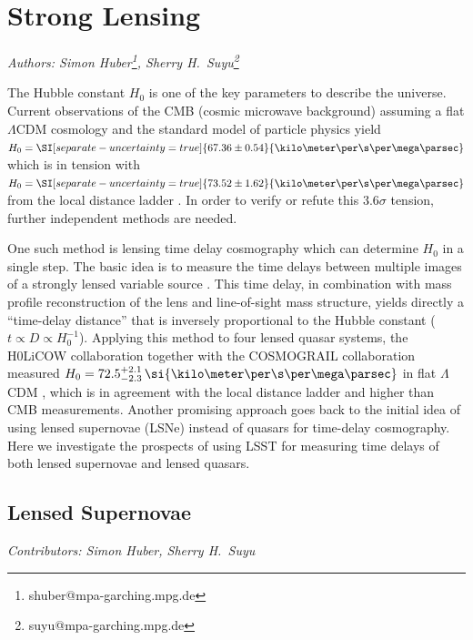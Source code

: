 

\section{Strong Lensing}
\textit{ Authors: Simon Huber\footnote{shuber@mpa-garching.mpg.de}, Sherry H.~Suyu\footnote{suyu@mpa-garching.mpg.de} }

The Hubble constant $H_0$ is one of the key parameters to describe the
universe. Current observations of the CMB (cosmic microwave
background) assuming a flat $\Lambda$CDM cosmology and the standard
model of particle physics yield $H_0 = \SI[separate-uncertainty =
true]{67.36 \pm 0.54}{\kilo\meter\per\s\per\mega\parsec}$
\citep{Planck:2018vks} which is in tension with $H_0 =
\SI[separate-uncertainty = true]{73.52 \pm
  1.62}{\kilo\meter\per\s\per\mega\parsec}$ from the local distance ladder
\citep{Riess:2016jrr,Riess:2018byc}. In order to verify or refute this
$3.6 \sigma$ tension, further independent methods are needed. 

One such method is lensing time delay cosmography which can determine
$H_0$ in a single step. The basic idea is to measure the time delays
between multiple images of a strongly lensed variable source
\citep{Refsdal:1964}. This time delay, in combination with mass
profile reconstruction of the lens and line-of-sight mass structure,
yields directly a ``time-delay distance'' that is inversely
proportional to the Hubble constant ($t \propto D \propto
H_0^{-1}$). Applying this method to four lensed quasar systems, the
H0LiCOW collaboration \citep{Suyu:2016qxx} together with the
COSMOGRAIL collaboration
\citep[e.g.]{Eigenbrod:2005ie,2013Tewes,2017Courbin} measured $H_0 =
72.5^{+2.1}_{-2.3} \, \si{\kilo\meter\per\s\per\mega\parsec}$ in flat
$\Lambda$CDM \citep{Birrer:2018vtm}, which is in agreement with the
local distance ladder and higher than CMB measurements.  Another
promising approach goes back to the initial idea of
\cite{Refsdal:1964} using lensed supernovae (LSNe) instead of quasars
for time-delay cosmography. Here we investigate the prospects of using
LSST for measuring time delays of both lensed supernovae and lensed
quasars.

\subsection{Lensed Supernovae}
\textit{Contributors: Simon Huber, Sherry H.~Suyu}


